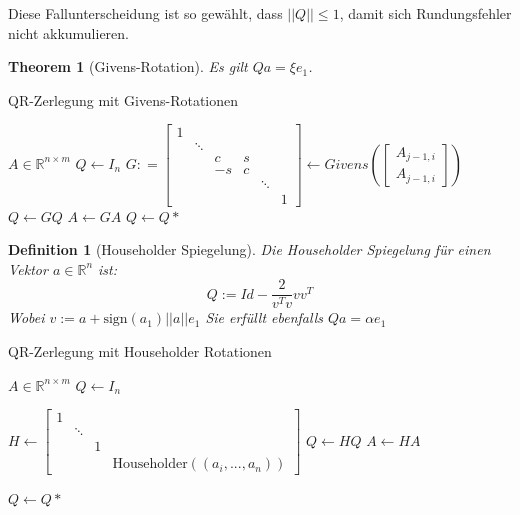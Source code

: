 \documentclass[10pt,a4paper]{article}
\newtheorem{theorem}{Theorem}
\newtheorem{definition}{Definition}
\begin{document}
	Diese Fallunterscheidung ist so gewählt, dass $||Q||\leq 1$, damit sich Rundungsfehler nicht akkumulieren.
	\begin{theorem}[Givens-Rotation]
		Es gilt $Qa = \xi e_1$.
	\end{theorem}
	\begin{algorithm}[H]
		\caption{QR-Zerlegung mit Givens-Rotationen}
		\begin{algorithmic}
			\Require $A \in \mathbb{R}^{n\times m}$
			\State $Q \leftarrow I_n$
					\State $G : = \begin{bmatrix}
					1 &  &  &  &  &  \\
					& \ddots &  &  &  &  \\
					&  & c & s &  &  \\
					&  & -s & c &  &  \\
					&  &  &  & \ddots &  \\
					&  &  &  &  & 1
				\end{bmatrix} \leftarrow Givens(\begin{bmatrix}
						A_{j-1,i} \\
						A_{j-1,i}
					\end{bmatrix})$
					\State $Q \leftarrow GQ$
					\State $A \leftarrow GA$
				\EndFor
			\EndFor
			\State $Q \leftarrow Q*$
		\end{algorithmic}
	\end{algorithm}
	\begin{definition}[Householder Spiegelung]
		Die Householder Spiegelung für einen Vektor $a \in \mathbb{R}^n$ ist:
		$$Q := Id -\frac{2}{v^Tv}vv^T$$
		Wobei $v :=a+\text{sign}(a_1)||a||e_1$
		Sie erfüllt ebenfalls $Qa = \alpha e_1$
	\end{definition}
	\begin{algorithm}
		\caption{QR-Zerlegung mit Householder Rotationen}
		\begin{algorithmic}
			\Require \Require $A \in \mathbb{R}^{n\times m}$
			\State $Q \leftarrow I_n$
			\For{$i \in [n]$}
			
			\State $H \leftarrow \begin{bmatrix}
				1 & & &    \\
				& \ddots & & \\
				& & 1 & \\
				& & & \text{Householder}((a_i, ..., a_n))
			\end{bmatrix}$
			\State $Q \leftarrow HQ$
			\State $A \leftarrow HA$
			
			\EndFor
			\State $Q \leftarrow Q*$
		\end{algorithmic}
	\end{algorithm}
\end{document}
